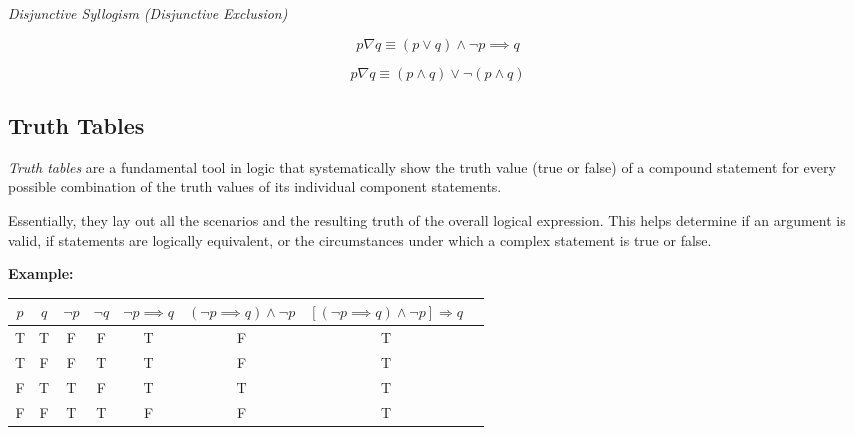 \emph{Disjunctive Syllogism (Disjunctive Exclusion)}

\[
	p \nabla q \equiv (p \lor q) \land \neg p \implies q
\]

\[
	p \nabla q \equiv(p \land q) \lor \neg  (p \land q)
\]

\subsection{Truth Tables}

\emph{Truth tables} are a fundamental tool in logic that systematically show the truth value
(true or false) of a compound statement for every possible combination of the truth values of 
its individual component statements.
\vspace{\baselineskip}

Essentially, they lay out all the scenarios and the resulting truth of the overall logical expression.
This helps determine if an argument is valid, if statements are logically equivalent, or the circumstances
under which a complex statement is true or false.
\vspace{\baselineskip}

\textbf{Example:}
\vspace{\baselineskip}


\begin{center}
	\begin{tabular}{|c|c|c|c|c|c|c|c|}
		\hline
		\(p\) & \(q\) & \(\neg p\) & \(\neg q\) & \(\neg p \implies q\) & \((\neg p \implies q) \land \neg p\) & \(\left[(\neg p \implies q) \land \neg p\right] \Rightarrow q\) \\
		\hline
		T   & T   & F        & F        & T                      & F                                     & T                                                                \\
		T   & F   & F        & T        & T                      & F                                     & T                                                                \\
		F   & T   & T        & F        & T                      & T                                     & T                                                                \\
		F   & F   & T        & T        & F                      & F                                     & T                                                                \\
		\hline
	\end{tabular}
\end{center}

